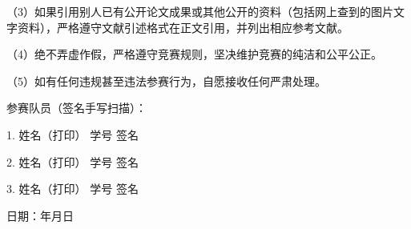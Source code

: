 \documentclass[12pt,a4paper]{article}
\begin{document}
（3）如果引用别人已有公开论文成果或其他公开的资料（包括网上查到的图片文字资料），严格遵守文献引述格式在正文引用，并列出相应参考文献。

（4）绝不弄虚作假，严格遵守竞赛规则，坚决维护竞赛的纯洁和公平公正。

（5）如有任何违规甚至违法参赛行为，自愿接收任何严肃处理。

\vspace{12pt}
参赛队员（签名手写扫描）：

\vspace{10pt}
1. 姓名（打印）\hspace{1.5cm} 学号\hspace{2cm} 签名

\vspace{18pt}
2. 姓名（打印）\hspace{1.5cm} 学号\hspace{2cm} 签名

\vspace{18pt}
3. 姓名（打印）\hspace{1.5cm} 学号\hspace{2cm} 签名

\vspace{24pt}
\hfill 日期：\quad 年\quad 月\quad 日
\end{document}
